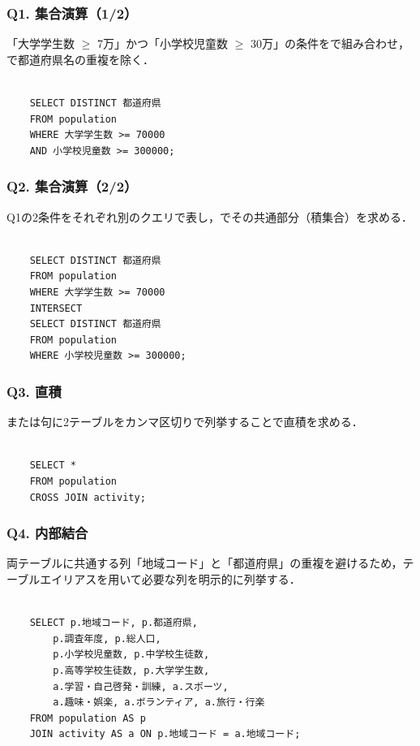 \subsubsection*{Q1. 集合演算（1/2）}
「大学学生数 $\geq$ 7万」かつ「小学校児童数 $\geq$ 30万」の条件をで組み合わせ，で都道府県名の重複を除く．
\begin{verbatim}

    SELECT DISTINCT 都道府県
    FROM population
    WHERE 大学学生数 >= 70000
    AND 小学校児童数 >= 300000;

\end{verbatim}

\subsubsection*{Q2. 集合演算（2/2）}
Q1の2条件をそれぞれ別のクエリで表し，でその共通部分（積集合）を求める．
\begin{verbatim}

    SELECT DISTINCT 都道府県
    FROM population
    WHERE 大学学生数 >= 70000
    INTERSECT
    SELECT DISTINCT 都道府県
    FROM population
    WHERE 小学校児童数 >= 300000;

\end{verbatim}

\subsubsection*{Q3. 直積}
または句に2テーブルをカンマ区切りで列挙することで直積を求める．
\begin{verbatim}

    SELECT *
    FROM population
    CROSS JOIN activity;

\end{verbatim}

\subsubsection*{Q4. 内部結合}
両テーブルに共通する列「地域コード」と「都道府県」の重複を避けるため，テーブルエイリアスを用いて必要な列を明示的に列挙する．
\begin{verbatim}

    SELECT p.地域コード, p.都道府県,
        p.調査年度, p.総人口,
        p.小学校児童数, p.中学校生徒数,
        p.高等学校生徒数, p.大学学生数,
        a.学習・自己啓発・訓練, a.スポーツ,
        a.趣味・娯楽, a.ボランティア, a.旅行・行楽
    FROM population AS p
    JOIN activity AS a ON p.地域コード = a.地域コード;

\end{verbatim}


